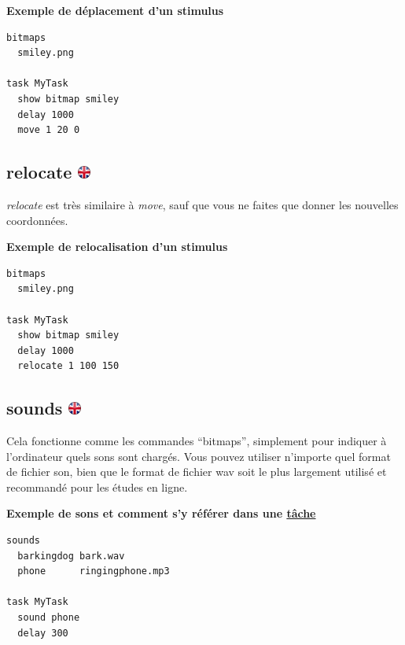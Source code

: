 \documentclass[
]{book}
\begin{document}
\textbf{Exemple de déplacement d'un stimulus}

\begin{verbatim}
bitmaps
  smiley.png

task MyTask
  show bitmap smiley
  delay 1000
  move 1 20 0
\end{verbatim}

\hypertarget{relocate}{%
\subsection[relocate ]{\texorpdfstring{relocate \href{https://www.psytoolkit.org/doc3.2.0/syntax.html\#relocate}{\protect\includegraphics{img/ukflag.png}}}{relocate }}\label{relocate}}

\emph{relocate} est très similaire à \emph{move}, sauf que vous ne faites que donner les nouvelles coordonnées.

\textbf{Exemple de relocalisation d'un stimulus}

\begin{verbatim}
bitmaps
  smiley.png

task MyTask
  show bitmap smiley
  delay 1000
  relocate 1 100 150
\end{verbatim}

\hypertarget{sounds}{%
\subsection[sounds ]{\texorpdfstring{sounds \href{https://www.psytoolkit.org/doc3.2.0/syntax.html\#sounds}{\protect\includegraphics{img/ukflag.png}}}{sounds }}\label{sounds}}

Cela fonctionne comme les commandes ``bitmaps'', simplement pour indiquer à l'ordinateur quels sons sont chargés. Vous pouvez utiliser n'importe quel format de fichier son, bien que le format de fichier wav soit le plus largement utilisé et recommandé pour les études en ligne.

\textbf{Exemple de sons et comment s'y référer dans une \protect\hyperlink{s5-7}{tâche}}

\begin{verbatim}
sounds
  barkingdog bark.wav
  phone      ringingphone.mp3

task MyTask
  sound phone
  delay 300
\end{verbatim}
\end{document}
